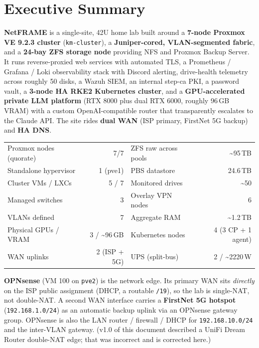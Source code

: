 \documentclass[11pt,letterpaper]{article}
\newcommand{\ip}[1]{\texttt{#1}}
\begin{document}
\section{Executive Summary}
\textbf{NetFRAME} is a single-site, 42U home lab built around a \textbf{7-node Proxmox VE 9.2.3 cluster} (\texttt{km-cluster}), a \textbf{Juniper-cored, VLAN-segmented fabric}, and a \textbf{24-bay ZFS storage node} providing NFS and Proxmox Backup Server. It runs reverse-proxied web services with automated TLS, a Prometheus / Grafana / Loki observability stack with Discord alerting, drive-health telemetry across roughly 50 disks, a Wazuh SIEM, an internal step-ca PKI, a password vault, a \textbf{3-node HA RKE2 Kubernetes cluster}, and a \textbf{GPU-accelerated private LLM platform} (RTX 8000 plus dual RTX 6000, roughly 96\,GB VRAM) with a custom OpenAI-compatible router that transparently escalates to the Claude API. The site rides \textbf{dual WAN} (ISP primary, FirstNet 5G backup) and \textbf{HA DNS}.

\vspace{2mm}
\noindent\begin{tabularx}{\textwidth}{@{}Xr@{\hskip 2em}Xr@{}}
\toprule
Proxmox nodes (quorate) & 7/7 & ZFS raw across pools & \textasciitilde95\,TB \\
Standalone hypervisor & 1 (pve1) & PBS datastore & 24.6\,TB \\
Cluster VMs / LXCs & 5 / 7 & Monitored drives & \textasciitilde50 \\
Managed switches & 3 & Overlay VPN nodes & 6 \\
VLANs defined & 7 & Aggregate RAM & \textasciitilde1.2\,TB \\
Physical GPUs / VRAM & 3 / \textasciitilde96\,GB & Kubernetes nodes & 4 (3 CP + 1 agent) \\
WAN uplinks & 2 (ISP + 5G) & UPS (split-bus) & 2 / \textasciitilde2220\,W \\
\bottomrule
\end{tabularx}

\begin{note}
\textbf{OPNsense} (VM 100 on \texttt{pve2}) is the network edge. Its primary WAN sits \emph{directly} on the ISP public assignment (DHCP, a routable \texttt{/19}), so the lab is single-NAT, not double-NAT. A second WAN interface carries a \textbf{FirstNet 5G hotspot} (\ip{192.168.1.0/24}) as an automatic backup uplink via an OPNsense gateway group. OPNsense is also the LAN router / firewall / DHCP for \ip{192.168.10.0/24} and the inter-VLAN gateway. (v1.0 of this document described a UniFi Dream Router double-NAT edge; that was incorrect and is corrected here.)
\end{note}
\end{document}
